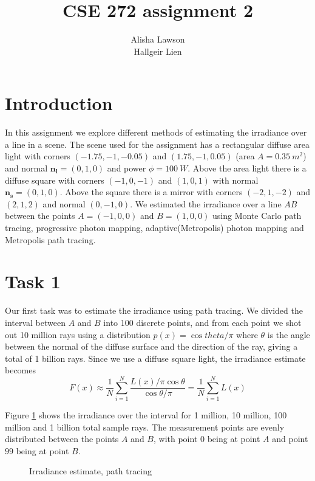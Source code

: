\documentclass{article} %
\title{CSE 272 assignment 2}
\author{Alisha Lawson\\Hallgeir Lien}
\date{}
\begin{document}
\maketitle
\newpage

\section*{Introduction}
In this assignment we explore different methods of estimating the irradiance over a line in a scene. The scene used for the assignment has a rectangular diffuse area light with corners $(-1.75,-1,-0.05)$ and $(1.75,-1,0.05)$ (area $A=0.35\ m^2$) and normal $\mathbf{n_l}=(0,1,0)$ and power $\phi=100\ W$. Above the area light there is a diffuse square with corners $(-1,0,-1)$ and $(1,0,1)$ with normal $\mathbf{n_s}=(0,1,0)$. Above the square there is a mirror with corners $(-2,1,-2)$ and $(2,1,2)$ and normal $(0,-1,0)$. We estimated the irradiance over a line $AB$ between the points $A=(-1,0,0)$ and $B=(1,0,0)$ using Monte Carlo path tracing, progressive photon mapping, adaptive(Metropolis) photon mapping and Metropolis path tracing. 

\section*{Task 1}
Our first task was to estimate the irradiance using path tracing. We divided the interval between $A$ and $B$ into 100 discrete points, and from each point we shot out 10 million rays using a distribution $p(x)=\cos theta / \pi$ where $\theta$ is the angle between the normal of the diffuse surface and the direction of the ray, giving a total of 1 billion rays. Since we use a diffuse square light, the irradiance estimate becomes
$$
F(x) \approx \frac{1}{N} \sum_{i=1}^N \frac{L(x)/\pi \cos \theta}{\cos \theta / \pi} = \frac{1}{N} \sum_{i=1}^N L(x)
$$

Figure \ref{fig:pathtracing} shows the irradiance over the interval for 1 million, 10 million, 100 million and 1 billion total sample rays. The measurement points are evenly distributed between the points $A$ and $B$, with point $0$ being at point $A$ and point $99$ being at point $B$.
\begin{figure}[h]
    \caption{Irradiance estimate, path tracing}
\label{fig:pathtracing}
\end{figure}
\end{document}
